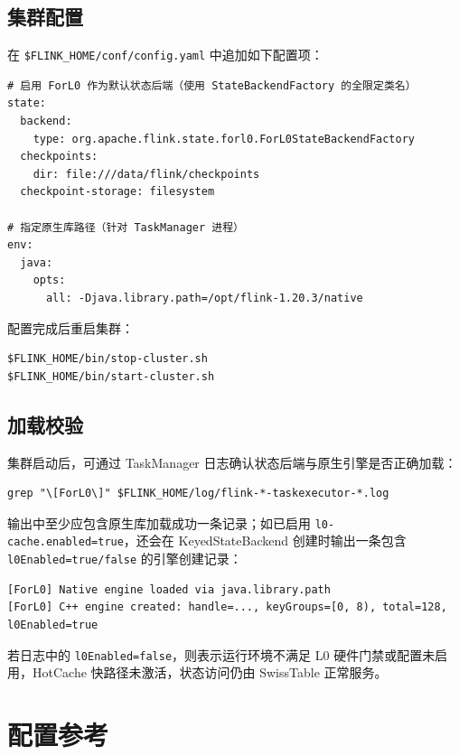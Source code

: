 \documentclass[a4paper,11pt]{article}
\begin{document}
\subsection{集群配置}

在 \texttt{\$FLINK\_HOME/conf/config.yaml} 中追加如下配置项：

\begin{lstlisting}[language=yamlcmd]
# 启用 ForL0 作为默认状态后端（使用 StateBackendFactory 的全限定类名）
state:
  backend:
    type: org.apache.flink.state.forl0.ForL0StateBackendFactory
  checkpoints:
    dir: file:///data/flink/checkpoints
  checkpoint-storage: filesystem

# 指定原生库路径（针对 TaskManager 进程）
env:
  java:
    opts:
      all: -Djava.library.path=/opt/flink-1.20.3/native
\end{lstlisting}

配置完成后重启集群：

\begin{lstlisting}[language=shellcmd]
$FLINK_HOME/bin/stop-cluster.sh
$FLINK_HOME/bin/start-cluster.sh
\end{lstlisting}

\subsection{加载校验}

集群启动后，可通过 TaskManager 日志确认状态后端与原生引擎是否正确加载：

\begin{lstlisting}[language=shellcmd]
grep "\[ForL0\]" $FLINK_HOME/log/flink-*-taskexecutor-*.log
\end{lstlisting}

输出中至少应包含原生库加载成功一条记录；如已启用 \texttt{l0-cache.enabled=true}，还会在 KeyedStateBackend 创建时输出一条包含 \texttt{l0Enabled=true/false} 的引擎创建记录：

\begin{lstlisting}[language=shellcmd]
[ForL0] Native engine loaded via java.library.path
[ForL0] C++ engine created: handle=..., keyGroups=[0, 8), total=128, l0Enabled=true
\end{lstlisting}

若日志中的 \texttt{l0Enabled=false}，则表示运行环境不满足 L0 硬件门禁或配置未启用，HotCache 快路径未激活，状态访问仍由 SwissTable 正常服务。

\section{配置参考}
\end{document}
